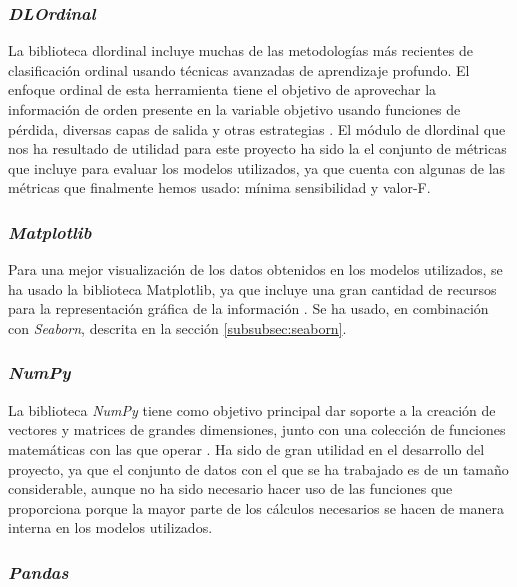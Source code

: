 \subsubsection{\textit{DLOrdinal}}
\label{subsubsec:dlordinal}

La biblioteca dlordinal incluye muchas de las metodologías más recientes de clasificación ordinal usando técnicas avanzadas de aprendizaje profundo. El enfoque ordinal de esta herramienta tiene el objetivo de aprovechar la información de orden presente en la variable objetivo usando funciones de pérdida, diversas capas de salida y otras estrategias \cite{dlordinal}. El módulo de dlordinal que nos ha resultado de utilidad para este proyecto ha sido la el conjunto de métricas que incluye para evaluar los modelos utilizados, ya que cuenta con algunas de las métricas que finalmente hemos usado: mínima sensibilidad y valor-F.

\subsubsection{\textit{Matplotlib}}
\label{subsubsec:matplotlib}

Para una mejor visualización de los datos obtenidos en los modelos utilizados, se ha usado la biblioteca Matplotlib, ya que incluye una gran cantidad de recursos para la representación gráfica de la información \cite{matplotlib}. Se ha usado, en combinación con \textit{Seaborn}, descrita en la sección \ref{subsubsec:seaborn}.

\subsubsection{\textit{NumPy}}
\label{subsubsec:numpy}

La biblioteca \textit{NumPy} tiene como objetivo principal dar soporte a la creación de vectores y matrices de grandes dimensiones, junto con una colección de funciones matemáticas con las que operar \cite{numpy}. Ha sido de gran utilidad en el desarrollo del proyecto, ya que el conjunto de datos con el que se ha trabajado es de un tamaño considerable, aunque no ha sido necesario hacer uso de las funciones que proporciona porque la mayor parte de los cálculos necesarios se hacen de manera interna en los modelos utilizados.

\subsubsection{\textit{Pandas}}
\label{subsubsec:pandas}

